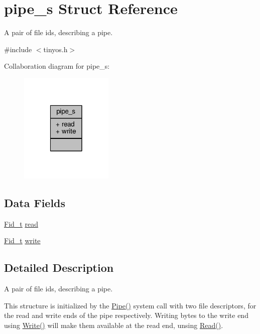 \hypertarget{structpipe__s}{\section{pipe\-\_\-s Struct Reference}
\label{structpipe__s}
}


A pair of file ids, describing a pipe.  




{\ttfamily \#include $<$tinyos.\-h$>$}



Collaboration diagram for pipe\-\_\-s\-:
\nopagebreak
\begin{figure}[H]
\begin{center}
\leavevmode
\includegraphics[width=126pt]{structpipe__s__coll__graph}
\end{center}
\end{figure}
\subsection*{Data Fields}
\begin{DoxyCompactItemize}
\item 
\hyperlink{group__syscalls_ga5097222c5f0da97d92d4712359abc38f}{Fid\-\_\-t} \hyperlink{structpipe__s_ad0839b4f9b1fdb0241411952203f18aa}{read}
\item 
\hyperlink{group__syscalls_ga5097222c5f0da97d92d4712359abc38f}{Fid\-\_\-t} \hyperlink{structpipe__s_a69acc9cdf5f10195c43491e3ffa98cb1}{write}
\end{DoxyCompactItemize}


\subsection{Detailed Description}
A pair of file ids, describing a pipe. 

This structure is initialized by the {\ttfamily \hyperlink{group__syscalls_gab6355ce54e047c31538ed5ed9108b5b3}{Pipe()}} system call with two file descriptors, for the read and write ends of the pipe respectively. Writing bytes to the write end using {\ttfamily \hyperlink{group__syscalls_gaf046f003fde24f79fb395c250137856c}{Write()}} will make them available at the read end, unsing {\ttfamily \hyperlink{group__syscalls_ga3e9dc545a789eb45b2d356eabbac3ee3}{Read()}}. 

